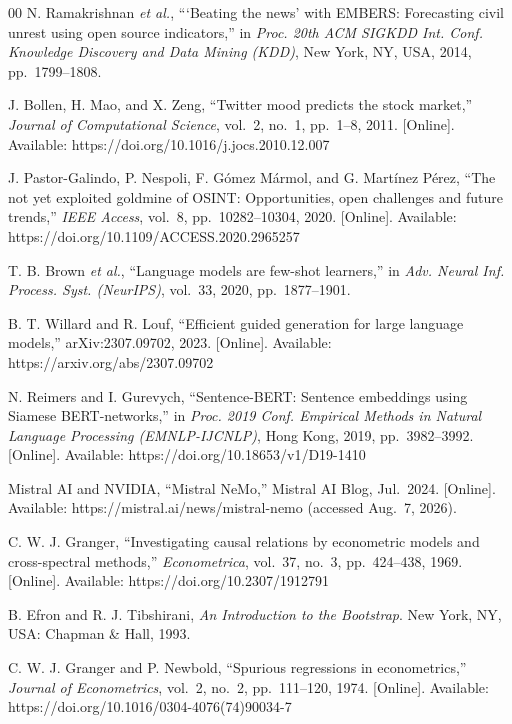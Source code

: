 \documentclass[conference]{IEEEtran}
\begin{document}
\begin{thebibliography}{00}
 N. Ramakrishnan \emph{et al.}, ```Beating the news' with
EMBERS: Forecasting civil unrest using open source indicators,'' in \emph{Proc.
20th ACM SIGKDD Int. Conf. Knowledge Discovery and Data Mining (KDD)}, New
York, NY, USA, 2014, pp.~1799--1808.

 J. Bollen, H. Mao, and X. Zeng, ``Twitter mood predicts
the stock market,'' \emph{Journal of Computational Science}, vol.~2, no.~1,
pp.~1--8, 2011. [Online]. Available:
https://doi.org/10.1016/j.jocs.2010.12.007

 J. Pastor-Galindo, P. Nespoli, F. G\'omez M\'armol, and
G. Mart\'inez P\'erez, ``The not yet exploited goldmine of OSINT:
Opportunities, open challenges and future trends,'' \emph{IEEE Access},
vol.~8, pp.~10282--10304, 2020. [Online]. Available:
https://doi.org/10.1109/ACCESS.2020.2965257

 T. B. Brown \emph{et al.}, ``Language models are few-shot
learners,'' in \emph{Adv. Neural Inf. Process. Syst. (NeurIPS)}, vol.~33, 2020,
pp.~1877--1901.

 B. T. Willard and R. Louf, ``Efficient guided generation
for large language models,'' arXiv:2307.09702, 2023. [Online]. Available:
https://arxiv.org/abs/2307.09702

 N. Reimers and I. Gurevych, ``Sentence-BERT: Sentence
embeddings using Siamese BERT-networks,'' in \emph{Proc. 2019 Conf. Empirical
Methods in Natural Language Processing (EMNLP-IJCNLP)}, Hong Kong, 2019,
pp.~3982--3992. [Online]. Available: https://doi.org/10.18653/v1/D19-1410

 Mistral AI and NVIDIA, ``Mistral NeMo,'' Mistral AI Blog,
Jul.~2024. [Online]. Available: https://mistral.ai/news/mistral-nemo (accessed
Aug.~7, 2026).

 C. W. J. Granger, ``Investigating causal relations by
econometric models and cross-spectral methods,'' \emph{Econometrica}, vol.~37,
no.~3, pp.~424--438, 1969. [Online]. Available:
https://doi.org/10.2307/1912791

 B. Efron and R. J. Tibshirani, \emph{An Introduction to the
Bootstrap}. New York, NY, USA: Chapman \& Hall, 1993.

 C. W. J. Granger and P. Newbold, ``Spurious
regressions in econometrics,'' \emph{Journal of Econometrics}, vol.~2, no.~2,
pp.~111--120, 1974. [Online]. Available:
https://doi.org/10.1016/0304-4076(74)90034-7


\end{thebibliography}
\end{document}
